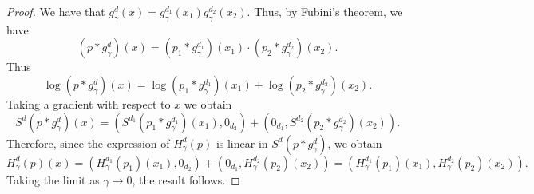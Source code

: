 \documentclass[10pt,a4paper]{amsart}
\begin{document}
\begin{proof}
  We have that $g_\gamma^d (x) = g_\gamma^{d_1}(x_1)g_\gamma^{d_2}(x_2)$. Thus, by Fubini's theorem, we have
  \[
(p*g^d_\gamma)(x) = (p_1*g^{d_1}_\gamma)(x_1)\cdot (p_2*g^{d_2}_\gamma)(x_2).
  \]
  Thus
    \[
\log (p*g^d_\gamma)(x) =\log  (p_1*g^{d_1}_\gamma)(x_1)+\log (p_2*g^{d_2}_\gamma)(x_2).
  \]
  Taking a gradient with respect to $x$ we obtain
  \[
  S^d(p*g^d_\gamma)(x) = (S^{d_1}(p_1*g^{d_1}_\gamma)(x_1),0_{d_2})+(0_{d_1},S^{d_2}(p_2*g^{d_2}_\gamma)(x_2)).
  \]
  Therefore, since the expression of $H^d_\gamma (p)$ is linear in $S^d(p*g^d_\gamma)$, we obtain
\[
H^d_\gamma (p)(x) =( H^{d_1}_\gamma (p_1)(x_1),0_{d_2})+(0_{d_1},H^{d_2}_\gamma (p_2)(x_2))=( H^{d_1}_\gamma (p_1)(x_1),H^{d_2}_\gamma (p_2)(x_2)).
\]
Taking the limit as $\gamma\to 0$, the result follows.
\end{proof}
\end{document}
